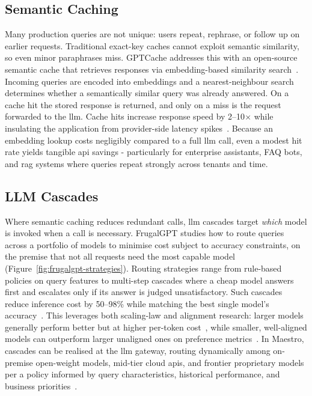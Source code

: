 \subsection{Semantic Caching}
\label{subsec:semantic-caching}

Many production queries are not unique: users repeat, rephrase, or follow up on earlier requests. Traditional exact-key caches cannot exploit semantic similarity, so even minor paraphrases miss. GPTCache addresses this with an open-source semantic cache that retrieves responses via embedding-based similarity search~\cite{bang2023gptcache}. Incoming queries are encoded into embeddings and a nearest-neighbour search determines whether a semantically similar query was already answered. On a cache hit the stored response is returned, and only on a miss is the request forwarded to the \gls{llm}. Cache hits increase response speed by 2--10$\times$ while insulating the application from provider-side latency spikes~\cite{bang2023gptcache}. Because an embedding lookup costs negligibly compared to a full \gls{llm} call, even a modest hit rate yields tangible \gls{api} savings - particularly for enterprise assistants, FAQ bots, and \gls{rag} systems where queries repeat strongly across tenants and time.

\subsection{LLM Cascades}
\label{subsec:llm-cascades}

Where semantic caching reduces redundant calls, \gls{llm} cascades target \emph{which} model is invoked when a call is necessary. FrugalGPT studies how to route queries across a portfolio of models to minimise cost subject to accuracy constraints, on the premise that not all requests need the most capable model~\cite{chen2023frugalgpt} (Figure~\ref{fig:frugalgpt-strategies}). Routing strategies range from rule-based policies on query features to multi-step cascades where a cheap model answers first and escalates only if its answer is judged unsatisfactory. Such cascades reduce inference cost by 50--98\% while matching the best single model's accuracy~\cite{chen2023frugalgpt}. This leverages both scaling-law and alignment research: larger models generally perform better but at higher per-token cost~\cite{brown2020gpt3}, while smaller, well-aligned models can outperform larger unaligned ones on preference metrics~\cite{ouyang2022instructgpt}. In Maestro, cascades can be realised at the \gls{llm} gateway, routing dynamically among on-premise open-weight models, mid-tier cloud \glspl{api}, and frontier proprietary models per a policy informed by query characteristics, historical performance, and business priorities~\cite{closer2025maestro,touvron2023llama2}.

